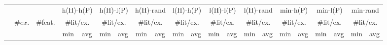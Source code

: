 \begin{tabular}{lccrrrrrrrrrrrrrrrrrr}
\toprule
& && \multicolumn{2}{c}{h(H)-h(P)} & \multicolumn{2}{c}{h(H)-l(P)} & \multicolumn{2}{c}{h(H)-rand} & \multicolumn{2}{c}{l(H)-h(P)} & \multicolumn{2}{c}{l(H)-l(P)} & \multicolumn{2}{c}{l(H)-rand} & \multicolumn{2}{c}{min-h(P)} & \multicolumn{2}{c}{min-l(P)} & \multicolumn{2}{c}{min-rand}\\
\cmidrule(rr){4-5}\cmidrule(rr){6-7}\cmidrule(rr){8-9}\cmidrule(rr){10-11}\cmidrule(rr){12-13}\cmidrule(rr){14-15}\cmidrule(rr){16-17}\cmidrule(rr){18-19}\cmidrule(rr){20-21}
&\multirow{2}{*}{$\#ex.$} & \multirow{2}{*}{\#feat.} &  \multicolumn{2}{c}{\#lit/ex.} & \multicolumn{2}{c}{\#lit/ex.} & \multicolumn{2}{c}{\#lit/ex.} & \multicolumn{2}{c}{\#lit/ex.} & \multicolumn{2}{c}{\#lit/ex.} & \multicolumn{2}{c}{\#lit/ex.} & \multicolumn{2}{c}{\#lit/ex.} & \multicolumn{2}{c}{\#lit/ex.} & \multicolumn{2}{c}{\#lit/ex.} \\\cmidrule(rl){4-5}\cmidrule(rl){6-7}\cmidrule(rl){8-9}\cmidrule(rl){10-11}\cmidrule(rl){12-13}\cmidrule(rl){14-15}\cmidrule(rl){16-17}\cmidrule(rl){18-19}\cmidrule(rl){20-21}
&& & \multicolumn{1}{c}{min} & \multicolumn{1}{c}{avg} & \multicolumn{1}{c}{min} & \multicolumn{1}{c}{avg} & \multicolumn{1}{c}{min} & \multicolumn{1}{c}{avg} & \multicolumn{1}{c}{min} & \multicolumn{1}{c}{avg} & \multicolumn{1}{c}{min} & \multicolumn{1}{c}{avg} & \multicolumn{1}{c}{min} & \multicolumn{1}{c}{avg} & \multicolumn{1}{c}{min} & \multicolumn{1}{c}{avg} & \multicolumn{1}{c}{min} & \multicolumn{1}{c}{avg} & \multicolumn{1}{c}{min} & \multicolumn{1}{c}{avg} \\
\midrule


\end{tabular}
